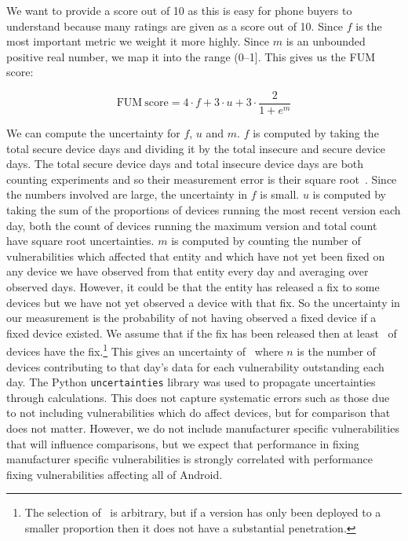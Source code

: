 We want to provide a score out of 10 as this is easy for phone buyers to understand because many ratings are given as a score out of 10.
Since $f$ is the most important metric we weight it more highly.
Since $m$ is an unbounded positive real number, we map it into the range (0--1].
This gives us the FUM score:

\begin{equation}
\mathrm{FUM\ score} = 4 \cdot f + 3 \cdot u + 3 \cdot \frac{2}{1+e^m}
\end{equation}

We can compute the uncertainty for $f$, $u$ and $m$.
$f$ is computed by taking the total secure device days and dividing it by the total insecure and secure device days.
The total secure device days and total insecure device days are both counting experiments and so their measurement error is their square root~\cite{Taylor1997}.
Since the numbers involved are large, the uncertainty in $f$ is small.
$u$ is computed by taking the sum of the proportions of devices running the most recent version each day, both the count of devices running the maximum version and total count have square root uncertainties.
$m$ is computed by counting the number of vulnerabilities which affected that entity and which have not yet been fixed on any device we have observed from that entity every day and averaging over observed days.
However, it could be that the entity has released a fix to some devices but we have not yet observed a device with that fix.
So the uncertainty in our measurement is the probability of not having observed a fixed device if a fixed device existed.
We assume that if the fix has been released then at least \daMeanOutstandingProbability\ of devices have the fix.\footnote{The selection of \daMeanOutstandingProbability\ is arbitrary, but if a version has only been deployed to a smaller proportion then it does not have a substantial penetration.}
This gives an uncertainty of \daMeanOutstandingUncertaintyEquation\ where $n$ is the number of devices contributing to that day's data for each vulnerability outstanding each day.
The Python \texttt{uncertainties} library was used to propagate uncertainties through calculations.
This does not capture systematic errors such as those due to not including vulnerabilities which do affect devices, but for comparison that does not matter.
However, we do not include manufacturer specific vulnerabilities that will influence comparisons, but we expect that performance in fixing manufacturer specific vulnerabilities is strongly correlated with performance fixing vulnerabilities affecting all of Android.

